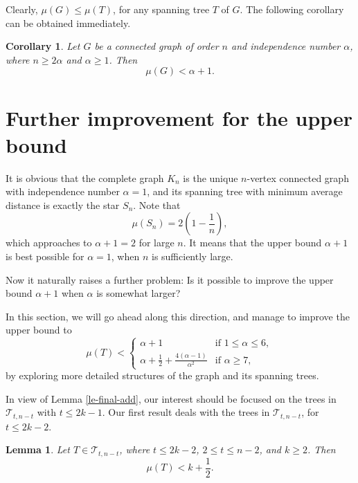 \documentclass[12pt]{article}
\newtheorem{Lemma}{Lemma}[section]
\newtheorem{Corollary}{Corollary}[section]
\begin{document}
Clearly, $\mu(G) \le \mu(T)$, for any spanning tree $T$ of $G$. The following corollary can be obtained immediately.

\begin{Corollary} \label{con}
Let $G$ be a connected graph of order $n$ and independence number $\alpha$, where $n \ge 2 \alpha$ and $\alpha \ge 1$. Then
$$
\mu(G) < \alpha + 1.
$$
\end{Corollary}

\section{Further improvement for the upper bound}

It is obvious that the complete graph $K_n$ is the unique $n$-vertex connected graph with independence number $\alpha = 1$, and its spanning tree with minimum average distance is exactly the star $S_n$. Note that
$$
\mu (S_n) = 2 \left( 1 - \frac{1}{n} \right),
$$
which approaches to $\alpha + 1 = 2$ for large $n$. It means that the upper bound $\alpha + 1$ is best possible for $\alpha = 1$, when $n$ is sufficiently large.



Now it naturally raises a further problem: Is it possible to improve the upper bound $\alpha + 1$ when $\alpha$ is somewhat larger?


In this section, we will go ahead along this direction, and manage to improve the upper bound to
$$
\renewcommand{\arraystretch}{1.2}
\mu(T) < \left\{\begin{array}{ll}
\alpha + 1  & \mbox{if $1 \le \alpha \le 6$},\\
 \alpha + \frac{1}{2} + \frac{4(\alpha-1)}{\alpha^2}
 & \mbox{if $\alpha \ge 7$},
\end{array}
\right.
$$
by exploring more detailed structures of the graph and its spanning trees.

In view of Lemma \ref{le-final-add}, our interest should be focused on the trees in $\mathcal{T}_{t,n-t}$ with $t \le 2 k- 1$.
Our first result deals with the trees in $\mathcal{T}_{t,n-t}$, for $t \le 2 k- 2$.

\begin{Lemma} \label{le-add}
Let $T \in \mathcal{T}_{t,n-t}$, where $t \le 2 k- 2$, $2 \le t \le n - 2$, and $k \ge 2$.
Then
$$
\mu (T) < k + \frac{1}{2}.
$$
\end{Lemma}
\end{document}

